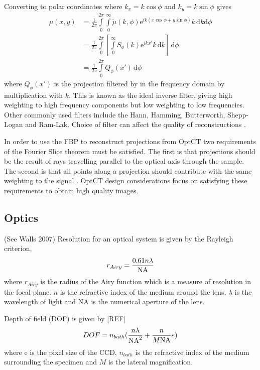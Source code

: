 \documentclass[12pt]{article}
\begin{document}
Converting to polar coordinates where $k_x=k\cos\phi$ and $k_y=k\sin\phi$ gives
\begin{align}
\mu(x,y) &= \frac{1}{2\pi} \int\limits_0^{2\pi} \int\limits_0^{\infty} \tilde{\mu}(k,\phi) \mathrm{e}^{ik\left(x\cos\phi+y\sin\phi\right)}k\, \mathrm{d}k\mathrm{d}\phi \\
&= \frac{1}{2\pi} \int\limits_0^{2\pi}\left[\int\limits_0^{\infty}S_{\phi}(k)\mathrm{e}^{ikx'}k\, \mathrm{d}k \right]\, \mathrm{d}\phi \\
&= \frac{1}{2\pi} \int\limits_0^{2\pi}Q_{\phi}(x')\, \mathrm{d}\phi
\end{align}
where $Q_{\phi}(x')$ is the projection filtered by in the frequency domain by multiplication with $k$. This is known as the ideal inverse filter, giving high weighting to high frequency components but low weighting to low frequencies. Other commonly used filters include the Hann,  Hamming, Butterworth, Shepp-Logan and Ram-Lak. Choice of filter can affect the quality of reconstructions \cite{russ2002image}.

In order to use the FBP to reconstruct projections from OptCT two requirements of the Fourier Slice theorem must be satisfied. The first is that projections should be the result of rays travelling parallel to the optical axis through the sample. The second is that all points along a projection should contribute with the same weighting to the signal \cite{Wang:2007}. OptCT design considerations focus on satisfying these requirements to obtain high quality images.






\subsection{Optics}

(See Walls 2007) Resolution for an optical system is given by the Rayleigh criterion,
\begin{equation}
r_{Airy} = \dfrac{0.61n\lambda}{\rm{NA}}
\end{equation}
where $r_{Airy}$ is the radius of the Airy function which is a measure of resolution in the focal plane. $n$ is the refractive index of the medium around the lens, $\lambda$ is the wavelength of light and NA is the numerical aperture of the lens. 

Depth of field (DOF) is given by [REF]
\begin{equation}
DOF = n_{bath}(\dfrac{n\lambda}{\rm{NA}^{2}} + \dfrac{n}{M\rm{NA}}e)
\end{equation}
where e is the pixel size of the CCD, $n_{bath}$ is the refractive index of the medium surrounding the specimen and $M$ is the lateral magnification.
\end{document}
